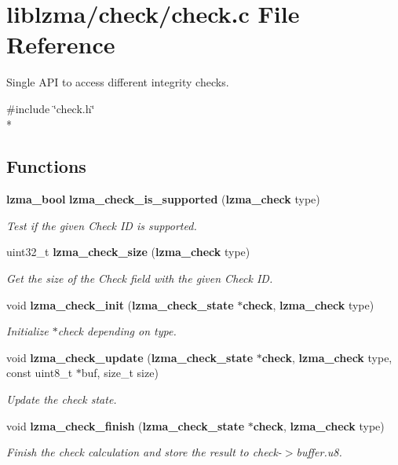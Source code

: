 \section{liblzma/check/check.c File Reference}
\label{check_8c}


Single A\-P\-I to access different integrity checks.  


{\ttfamily \#include \char`\"{}check.\-h\char`\"{}}\\*
\subsection*{Functions}
\begin{DoxyCompactItemize}
\item 
{\bf lzma\-\_\-bool} {\bf lzma\-\_\-check\-\_\-is\-\_\-supported} ({\bf lzma\-\_\-check} type)
\begin{DoxyCompactList}\small\item\em Test if the given Check I\-D is supported. \end{DoxyCompactList}\item 
uint32\-\_\-t {\bf lzma\-\_\-check\-\_\-size} ({\bf lzma\-\_\-check} type)
\begin{DoxyCompactList}\small\item\em Get the size of the Check field with the given Check I\-D. \end{DoxyCompactList}\item 
void {\bf lzma\-\_\-check\-\_\-init} ({\bf lzma\-\_\-check\-\_\-state} $\ast${\bf check}, {\bf lzma\-\_\-check} type)
\begin{DoxyCompactList}\small\item\em Initialize $\ast$check depending on type. \end{DoxyCompactList}\item 
void {\bf lzma\-\_\-check\-\_\-update} ({\bf lzma\-\_\-check\-\_\-state} $\ast${\bf check}, {\bf lzma\-\_\-check} type, const uint8\-\_\-t $\ast$buf, size\-\_\-t size)
\begin{DoxyCompactList}\small\item\em Update the check state. \end{DoxyCompactList}\item 
void {\bf lzma\-\_\-check\-\_\-finish} ({\bf lzma\-\_\-check\-\_\-state} $\ast${\bf check}, {\bf lzma\-\_\-check} type)
\begin{DoxyCompactList}\small\item\em Finish the check calculation and store the result to check-\/$>$buffer.\-u8. \end{DoxyCompactList}\end{DoxyCompactItemize}


